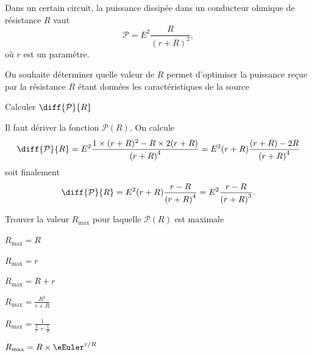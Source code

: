 Dans un certain circuit, la puissance dissipée dans un conducteur ohmique de résistance $R$ %
vaut 
\[
\mathcal{P}=E^2\frac{R}{(r+R)^2},
\]
où $r$ est un paramètre.

On souhaite déterminer quelle valeur de $R$ permet d'optimiser la puissance reçue par la résistance $R$ étant données les caractéristiques de la source 

\debutEntrainement





\begin{enonce}
Calculer $\diff{\mathcal{P}}{R}$
\end{enonce}


\begin{corrige}
Il faut dériver la fonction $\mathcal{P}(R)$. On calcule%
\[
\diff{\mathcal{P}}{R}=E^2\frac{1 \times (r+R)^2-R\times 2(r+R)}{\left(r+R \right)^4}=E^2(r+R)\frac{(r+R)-2R}{\left(r+R \right)^4}
\]
soit finalement
\[
\diff{\mathcal{P}}{R}=E^2(r+R)\frac{r-R}{\left(r+R \right)^4}=E^2\frac{r-R}{\left(r+R \right)^3}.
\]
\end{corrige}




\begin{enonce}
Trouver la valeur $R_\text{max}$ pour laquelle $\mathcal{P}(R)$ est maximale
\begin{listeQCM4Colonnes}
	\item $R_\text{max}=R$ \smallskip
	\item $R_\text{max}=r$
	\columnbreak
	\item $R_\text{max}=R+r$
	\item $R_\text{max}=\frac{R^2}{r+R}$
	\columnbreak
	\item $R_\text{max}=\frac{1}{\frac{1}{r}+\frac{1}{R}}$
	\columnbreak
	\item $R_\text{max}=R\times \eEuler^{r/R}$
	\smallskip
\end{listeQCM4Colonnes}

\bigskip

\end{enonce}


